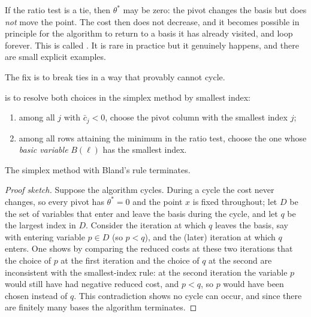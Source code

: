 \documentclass[a4paper]{scrartcl}
\begin{document}
\begin{center}
\end{center}

If the ratio test is a tie, then $\theta^*$ may be zero: the pivot changes the basis but does \emph{not} move the point. The cost then does not decrease, and it becomes possible in principle for the algorithm to return to a basis it has already visited, and loop forever. This is called . It is rare in practice but it genuinely happens, and there are small explicit examples.

The fix is to break ties in a way that provably cannot cycle.

\begin{definition}
     is to resolve both choices in the simplex method by smallest index:
    \begin{enumerate}[label=(\roman*)]
        \item among all $j$ with $\bar c_j < 0$, choose the pivot column with the smallest index $j$;
        \item among all rows attaining the minimum in the ratio test, choose the one whose \emph{basic variable} $B(\ell)$ has the smallest index.
    \end{enumerate}
\end{definition}

\begin{theorem}[Bland]
    The simplex method with Bland's rule terminates.
\end{theorem}
\begin{proof}[Proof sketch]
    Suppose the algorithm cycles. During a cycle the cost never changes, so every pivot has $\theta^* = 0$ and the point $x$ is fixed throughout; let $D$ be the set of variables that enter and leave the basis during the cycle, and let $q$ be the largest index in $D$. Consider the iteration at which $q$ leaves the basis, say with entering variable $p \in D$ (so $p < q$), and the (later) iteration at which $q$ enters. One shows by comparing the reduced costs at these two iterations that the choice of $p$ at the first iteration and the choice of $q$ at the second are inconsistent with the smallest-index rule: at the second iteration the variable $p$ would still have had negative reduced cost, and $p < q$, so $p$ would have been chosen instead of $q$. This contradiction shows no cycle can occur, and since there are finitely many bases the algorithm terminates.
\end{proof}
\end{document}
